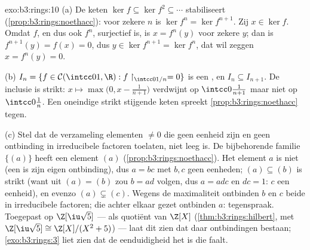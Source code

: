 \begin{solution}{exo:b3:rings:10}
(a) De keten $\ker f \subseteq \ker f^2 \subseteq \cdots$
stabiliseert (\cref{prop:b3:rings:noethacc}): voor zekere $n$ is
$\ker f^n = \ker f^{n+1}$. Zij $x \in \ker f$. Omdat $f$, en dus
ook $f^n$, surjectief is, is $x = f^n(y)$ voor zekere $y$; dan is
$f^{n+1}(y) = f(x) = 0$, dus $y \in \ker f^{n+1} = \ker f^n$, dat
wil zeggen $x = f^n(y) = 0$.

(b) $I_n = \{f \in \mathcal C(\intcc01, \R) : f\restriction_{
\intcc0{1/n}} = 0\}$ is een , en $I_n \subseteq I_{n+1}$. De
inclusie is strikt: $x \mapsto \max\bigl(0, x - \frac1{n+1}\bigr)$
verdwijnt op $\intcc0{\frac1{n+1}}$ maar niet op
$\intcc0{\frac1n}$. Een oneindige strikt stijgende keten spreekt
\cref{prop:b3:rings:noethacc} tegen.

(c) Stel dat de verzameling elementen $\neq 0$ die geen eenheid
zijn en geen ontbinding in irreducibele factoren toelaten, niet
leeg is. De bijbehorende familie  $\{(a)\}$ heeft een
 element $(a)$ (\cref{prop:b3:rings:noethacc}). Het element
$a$ is niet  (een  is zijn eigen
ontbinding), dus $a = bc$ met $b, c$ geen eenheden; $(a) \subseteq
(b)$ is strikt (want uit $(a) = (b)$ zou $b = ad$ volgen, dus $a =
adc$ en $dc = 1$: $c$ een eenheid), en evenzo $(a) \subsetneq (c)$.
Wegens de maximaliteit ontbinden $b$ en $c$ beide in irreducibele
factoren; die achter elkaar gezet ontbinden $a$: tegenspraak.
Toegepast op $\Z[\iu\sqrt5]$ ---  als quotiënt van $\Z[X]$
(\cref{thm:b3:rings:hilbert}, met $\Z[\iu\sqrt5] \cong
\Z[X]/(X^2+5)$) --- laat dit zien dat daar ontbindingen bestaan;
\cref{exo:b3:rings:3} liet zien dat de eenduidigheid het is die
faalt.
\end{solution}

